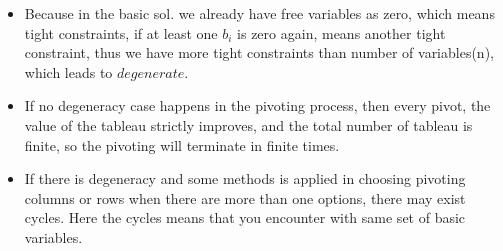 \documentclass{article}
\begin{document}
\begin{itemize}
\begin{itemize}
\item Because in the basic sol. we already have free variables as zero, which means tight constraints, if at least one $b_i$ is zero again, means another tight constraint, thus we have more tight constraints than number of variables(n), which leads to $degenerate$.
\item If no degeneracy case happens in the pivoting process, then every pivot, the value of the tableau strictly improves, and the total number of tableau is finite, so the pivoting will terminate in finite times.
\item If there is degeneracy and some methods is applied in choosing pivoting columns or rows when there are more than one options, there may exist cycles. Here the cycles means that you encounter with same set of basic variables.


\end{itemize}
\end{itemize}
\end{document}
